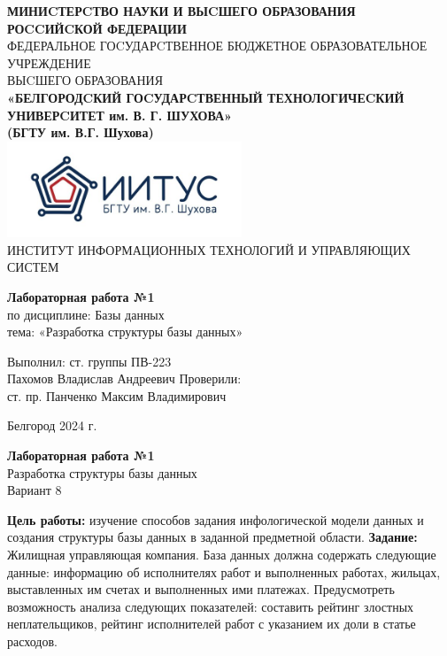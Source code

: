 \documentclass[a4paper,14pt]{extarticle}
\newcommand\textbox[1]{
	\parbox{.45\textwidth}{#1}
}
\begin{document}
\begin{center}
    \small{
        \textbf{МИНИCТЕРCТВО НАУКИ И ВЫCШЕГО ОБРАЗОВАНИЯ РОCCИЙCКОЙ ФЕДЕРАЦИИ}\\
        ФЕДЕРАЛЬНОЕ ГОCУДАРCТВЕННОЕ БЮДЖЕТНОЕ ОБРАЗОВАТЕЛЬНОЕ УЧРЕЖДЕНИЕ\\ВЫCШЕГО ОБРАЗОВАНИЯ \\
        \textbf{«БЕЛГОРОДCКИЙ ГОCУДАРCТВЕННЫЙ ТЕХНОЛОГИЧЕCКИЙ\\УНИВЕРCИТЕТ им. В. Г. ШУХОВА»\\ (БГТУ им. В.Г. Шухова)} \\
        \bigbreak
        \includegraphics[width=70mm]{log}\\
        ИНСТИТУТ ИНФОРМАЦИОННЫХ ТЕХНОЛОГИЙ И УПРАВЛЯЮЩИХ СИСТЕМ\\}
\end{center}

\vfill
\begin{center}
    \large{
        \textbf{
            Лабораторная работа №1}}\\
    \normalsize{
        по дисциплине: Базы данных \\
        тема: «Разработка структуры базы данных»}
\end{center}
\vfill
\hfill\textbox{
    Выполнил: ст. группы ПВ-223\\Пахомов Владислав Андреевич
    \bigbreak
    Проверили: \\ст. пр. Панченко Максим Владимирович
}
\vfill\begin{center}
    Белгород 2024 г.
\end{center}
\newpage
\begin{center}
    \textbf{Лабораторная работа №1}\\
    Разработка структуры базы данных\\
    Вариант 8
\end{center}
\textbf{Цель работы: }изучение способов задания инфологической модели данных и создания структуры базы данных в заданной предметной области.
\textbf{Задание: }Жилищная управляющая компания. База данных должна содержать следующие данные: информацию об исполнителях работ и выполненных работах, жильцах, выставленных им счетах и выполненных ими платежах. Предусмотреть возможность анализа следующих показателей: составить рейтинг злостных неплательщиков, рейтинг исполнителей работ с указанием их доли в статье расходов.
\end{document}
